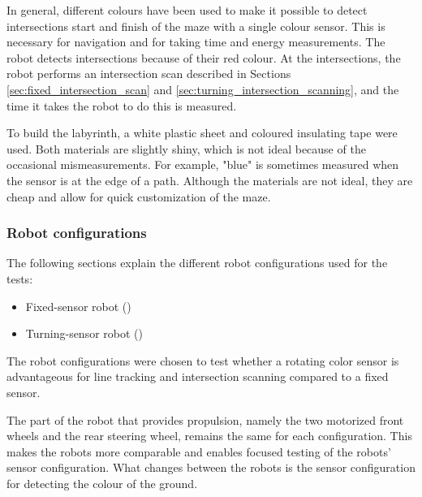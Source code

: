 In general, different colours have been used to make it possible to detect intersections start and finish of the maze with a single colour sensor. This is necessary for navigation and for taking time and energy measurements. The robot detects intersections because of their red colour. At the intersections, the robot performs an intersection scan described in Sections \ref{sec:fixed_intersection_scan} and \ref{sec:turning_intersection_scanning}, and the time it takes the robot to do this is measured.

To build the labyrinth, a white plastic sheet and coloured insulating tape were used. Both materials are slightly shiny, which is not ideal because of the occasional mismeasurements. For example, "blue" is sometimes measured when the sensor is at the edge of a path. Although the materials are not ideal, they are cheap and allow for quick customization of the maze.


\subsubsection{Robot configurations}
The following sections explain the different robot configurations used for the tests:
\begin{itemize}
    \item Fixed-sensor robot (\FixRob)
    \item Turning-sensor robot (\TurnRob)
\end{itemize}

\noindent The robot configurations were chosen to test whether a rotating color sensor is advantageous for line tracking and intersection scanning compared to a fixed sensor.

The part of the robot that provides propulsion, namely the two motorized front wheels and the rear steering wheel, remains the same for each configuration. This makes the robots more comparable and enables focused testing of the robots' sensor configuration. What changes between the robots is the sensor configuration for detecting the colour of the ground.

